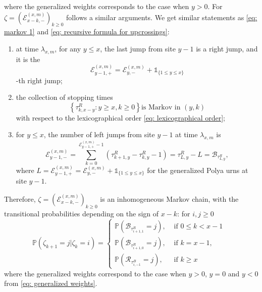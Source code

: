 \documentclass[twoside,12pt,a4paper]{article}
\numberwithin{equation}{section}
\begin{document}
   		where the generalized weights corresponds to the case when $y>0$.
   		For $\zeta= \left(\mathcal{E}^{(x,m)}_{x-k,-} \right)_{k\geq 0}$ follows a similar arguments. We get similar statements as \eqref{eq: markov 1} and \eqref{eq: recursive formula for upcrossings}:
   		\begin{enumerate}
   			\item 
   			at time $\lambda_{x,m}$, for any $y\leq x$, the last jump from site $y-1$ is a right jump, and it is the 
   			\begin{equation}\label{eq: source of inhomogeneity}
   				\mathcal{E}_{y-1,+}^{(x,m)} = \mathcal{E}_{y,-}^{(x,m)} + \mathbb{1}_{ \{ 1\leq y \leq x \} }
   			\end{equation}
   			-th right jump; 
   			\item 
   			the collection of stopping times
   			\begin{equation}\label{eq: markov 2} 
   				\left\{\tau^R_{k,x-y}: y\geq x, k\geq 0 \right\} \mbox{is Markov in $(y,k)$}
   			\end{equation} with respect to the lexicographical order \eqref{eq: lexicographical order}; 
   			\item 
   			for $y\leq x$, the number of left jumps from site $y-1$  at time $\lambda_{x,m}$ is
   		\begin{equation} \label{eq: recursive formula for downcrossings}
   			\mathcal{E}_{y-1,-}^{(x,m)} 	=  \sum_{k= 0 }^{\mathcal{E}_{y-1,+}^{(x,m)}-1}	\left(\tau^R_{k+1,y}-\tau^R_{k,y}-1 \right) = \tau^R_{ L,y } - L = \mathcal{B}_{\tau^R_{ L,y }},
   		\end{equation}  where $L= \mathcal{E}_{y-1,+}^{(x,m)} = \mathcal{E}_{y,-}^{(x,m)} + \mathbb{1}_{\{ 1\leq y \leq x \}} $ 
   		for the generalized Polya urns at site $y-1$.
   		\end{enumerate}	
   	 Therefore, $\zeta= \left(\mathcal{E}^{(x,m)}_{x-k,-} \right)_{k\geq 0}$ is an inhomogeneous Markov chain, with the transitional probabilities  depending on the sign of $x-k$: for $i,j\geq 0$
	   \begin{equation}\label{eq: transition prob on negative}
		   	\mathbb{P}\left(\zeta_{k+1}=j \vert \zeta_k =i  \right) = 
		   \begin{cases}
		   	\mathbb{P}\left( \mathcal{B}_{\tau_{i+1,1}^R} = j \right) ,& \mbox{ if $0 \leq k <  x-1$ }
		   	\\
		   	\mathbb{P}\left( \mathcal{B}_{\tau_{i+1,0}^R} = j \right) ,& \mbox{ if  $k =  x-1$, }
		   	\\
		   	\mathbb{P}\left( \mathcal{R}_{\tau_{i,-1}^B} = j \right) ,& \mbox{ if $k \geq x$ }
		   \end{cases}
		\end{equation}
 where the generalized weights correspond to the case when $y>0$, $y=0$ and $y<0$ from \eqref{eq: generalized weights}.
\end{document}
